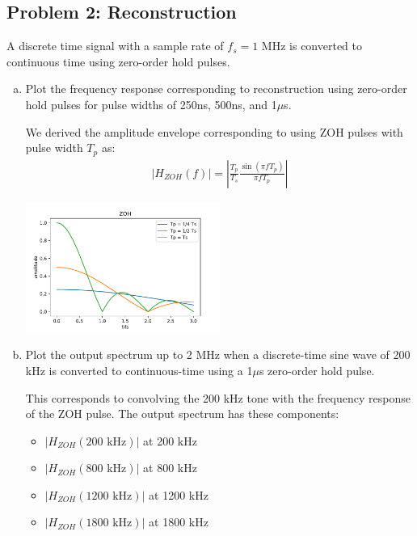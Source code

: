 \documentclass[11pt]{article}
\begin{document}
\subsection*{Problem 2: Reconstruction}
A discrete time signal with a sample rate of $f_s = 1$ MHz is converted to continuous time using zero-order hold pulses.
\begin{enumerate}[a)]
    \item Plot the frequency response corresponding to reconstruction using zero-order hold pulses for pulse widths of 250ns, 500ns, and 1$\mu$s.

        We derived the amplitude envelope corresponding to using ZOH pulses with pulse width $T_p$ as:
        \begin{align*}
            |H_{ZOH}(f)| = \left| \frac{T_p}{T_s} \frac{\sin(\pi f T_p)}{\pi f T_p}\right|
        \end{align*}
        \begin{center}
        \includegraphics[width=0.5\textwidth]{figs/zoh.pdf}
        \end{center}
    \item Plot the output spectrum up to 2 MHz when a discrete-time sine wave of 200 kHz is converted to continuous-time using a 1$\mu$s zero-order hold pulse.

        This corresponds to convolving the 200 kHz tone with the frequency response of the ZOH pulse.
        The output spectrum has these components:
        \begin{itemize}
            \item $|H_{ZOH}(200 \text{ kHz})|$ at 200 kHz
            \item $|H_{ZOH}(800 \text{ kHz})|$ at 800 kHz
            \item $|H_{ZOH}(1200 \text{ kHz})|$ at 1200 kHz
            \item $|H_{ZOH}(1800 \text{ kHz})|$ at 1800 kHz
        \end{itemize}
\end{enumerate}
\end{document}
